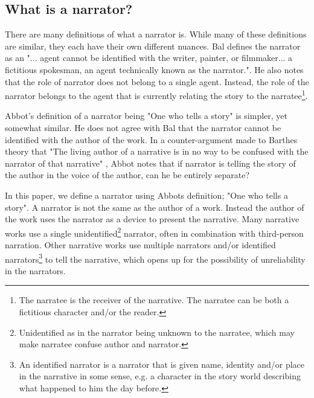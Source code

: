 \subsection{What is a narrator?}
There are many definitions of what a narrator is. While many of these definitions are similar, they each have their own different nuances. Bal defines the narrator as an "... agent cannot be identified with the writer, painter, or filmmaker... a fictitious spokesman, an agent technically known as the narrator."\cite[p. 8]{Bal}. He also notes that the role of narrator does not belong to a single agent. Instead, the role of the narrator belongs to the agent that is currently relating the story to the narratee\footnote{The narratee is the receiver of the narrative. The narratee can be both a fictitious character and/or the reader.}. 

Abbot's definition of a narrator being "One who tells a story"\cite[p. 238]{Abbot} is simpler, yet somewhat similar. He does not agree with Bal that the narrator cannot be identified with the author of the work. In a counter-argument made to Barthes theory that "The living author of a narrative is in no way to be confused with the narrator of that narrative" \cite[p. 261]{Barthes}, Abbot notes that if narrator is telling the story of the author in the voice of the author, can he be entirely separate?

In this paper, we define a narrator using Abbots definition; "One who tells a story"\cite[p. 238]{Abbot}. A narrator is not the same as the author of a work. Instead the author of the work uses the narrator as a device to present the narrative. Many narrative works use a single unidentified\footnote{Unidentified as in the narrator being unknown to the narratee, which may make narratee confuse author and narrator.} narrator, often in combination with third-person narration. Other narrative works use multiple narrators and/or identified narrators\footnote{An identified narrator is a narrator that is given name, identity and/or place in the narrative in some sense, e.g. a character in the story world describing what happened to him the day before.} to tell the narrative, which opens up for the possibility of unreliability in the narrators.